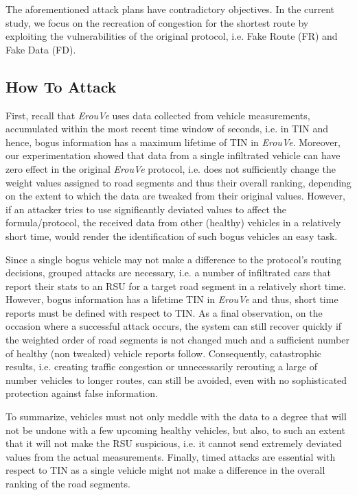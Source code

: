 \documentclass[conference]{IEEEtran}
\begin{document}
The aforementioned attack plans have contradictory objectives. In the current study, we focus on the recreation of congestion for the shortest route by 
exploiting the vulnerabilities of the original protocol, i.e. Fake Route (FR) and Fake Data (FD).










\subsection{How To Attack}
First, recall that {\it ErouVe} uses data collected from vehicle measurements, accumulated within the most recent time window of  seconds,
i.e. in TIN and hence, bogus information has a maximum lifetime of TIN in {\it ErouVe}. Moreover, our experimentation showed that data from a 
single infiltrated vehicle can have zero effect in the original {\it ErouVe} protocol, i.e. does not sufficiently change the weight values assigned to road
segments and thus their overall ranking, depending on the extent to which the data are tweaked from their original values. However, if an attacker tries to use significantly
deviated values to affect the formula/protocol, the received data from other (healthy) vehicles in a relatively short time, would render the identification of such bogus vehicles an easy task.


Since a single bogus vehicle may not make a difference to the protocol's routing decisions, grouped attacks are necessary, i.e. a number of infiltrated cars that 
report their stats to an RSU for a target road segment in a relatively short time. However, bogus information has a lifetime
TIN in {\it ErouVe} and thus, short time reports must be defined with respect to TIN.  As a final observation, on the occasion 
where a successful attack occurs, the system can still recover quickly if the weighted order of road segments is not changed much and a sufficient number of healthy 
(non tweaked) vehicle reports follow. Consequently, catastrophic results, i.e. creating traffic congestion or unnecessarily rerouting a large of number vehicles to longer routes, 
can still be avoided, even with no sophisticated protection against false information.

To summarize, vehicles must not only meddle with the data to a degree that will not be undone with a few upcoming healthy vehicles, but also, to such an extent 
that it will not make the RSU suspicious, i.e. it cannot send extremely deviated values from the actual measurements. Finally, timed attacks are essential
with respect to TIN as a single vehicle might not make a difference in the overall ranking of the road segments.
\end{document}
